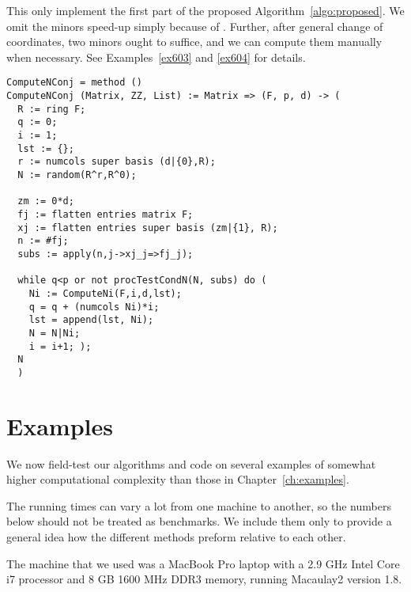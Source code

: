 \documentclass[fleqn,reqno]{amsart}
\begin{document}
\begin{paragraf}
\label{code:algo:proposed}
This only implement the first part of the proposed Algorithm~\ref{algo:proposed}.
We omit the minors speed-up simply because of .
Further, after general change of coordinates, two minors ought to suffice,
and we can compute them manually when necessary.
See Examples~\ref{ex603} and \ref{ex604} for details.
\begin{verbatim}
ComputeNConj = method ()
ComputeNConj (Matrix, ZZ, List) := Matrix => (F, p, d) -> (
  R := ring F;
  q := 0;
  i := 1;
  lst := {};
  r := numcols super basis (d|{0},R);
  N := random(R^r,R^0);
  
  zm := 0*d;
  fj := flatten entries matrix F;
  xj := flatten entries super basis (zm|{1}, R);
  n := #fj;
  subs := apply(n,j->xj_j=>fj_j);
  
  while q<p or not procTestCondN(N, subs) do (
    Ni := ComputeNi(F,i,d,lst);
    q = q + (numcols Ni)*i;
    lst = append(lst, Ni);
    N = N|Ni;
    i = i+1; );
  N
  )
\end{verbatim}
\end{paragraf}



\section{Examples}
\label{sec:long-examples}

\begin{paragraf*}
We now field-test our algorithms and code on several examples of
somewhat higher computational complexity than those in Chapter~\ref{ch:examples}.

The running times can vary a lot from one machine to another,
so the numbers below should not be treated as benchmarks.
We include them only to provide a general idea how the different methods preform
relative to each other.

The machine that we used was a MacBook Pro laptop with
a 2.9 GHz Intel Core i7 processor and 8 GB 1600 MHz DDR3 memory,
running Macaulay2 version 1.8.
\end{paragraf*}
\end{document}
